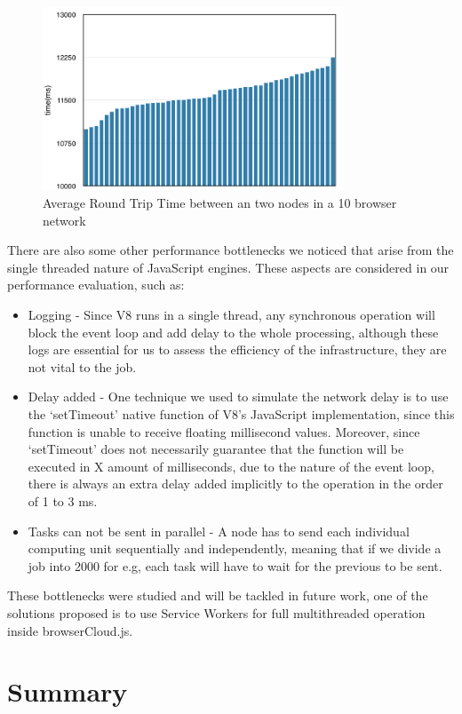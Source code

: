 \begin{figure}[]
  \centering
  \includegraphics[width=0.8\textwidth]{figs/rtt.png}
  \caption{Average Round Trip Time between an two nodes in a 10 browser network}
  \label{fig:rtt}
\end{figure}


There are also some other performance bottlenecks we noticed that arise from the single threaded nature of JavaScript engines. These aspects are considered in our performance evaluation, such as:

\begin{itemize}
  \item Logging - Since V8 runs in a single thread, any synchronous operation will block the event loop and add delay to the whole processing, although these logs are essential for us to assess the efficiency of the infrastructure, they are not vital to the job.
  \item Delay added - One technique we used to simulate the network delay is to use the `setTimeout' native function of V8's JavaScript implementation, since this function is unable to receive floating millisecond values. Moreover, since `setTimeout' does not necessarily guarantee that the function will be executed in X amount of milliseconds, due to the nature of the event loop, there is always an extra delay added implicitly to the operation in the order of 1 to 3 ms.
  \item Tasks can not be sent in parallel - A node has to send each individual computing unit sequentially and independently, meaning that if we divide a job into 2000 for e.g, each task will have to wait for the previous to be sent.
\end{itemize}

These bottlenecks were studied and will be tackled in future work, one of the solutions proposed is to use Service Workers\cite{ServiceWorkers} for full multithreaded operation inside browserCloud.js.


\section*{Summary}

